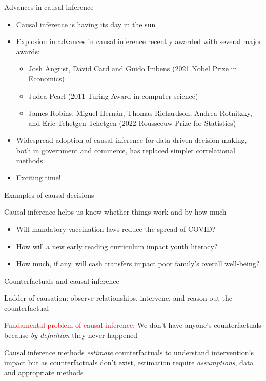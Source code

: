 \documentclass{beamer}
\begin{document}
\begin{frame}{Advances in causal inference}

\begin{itemize}
\item Causal inference is having its day in the sun
\item Explosion in advances in causal inference recently awarded with several major awards: 
	\begin{itemize}
	\item Josh Angrist, David Card and Guido Imbens (2021 Nobel Prize in Economics)
	\item Judea Pearl (2011 Turing Award in computer science)
	\item James Robins, Miguel Hernán, Thomas Richardson, Andrea Rotnitzky, and Eric Tchetgen Tchetgen (2022 Rousseeuw Prize for Statistics)
	\end{itemize}
\item Widespread adoption of causal inference for data driven decision making, both in government and commerce, has replaced simpler correlational methods
\item Exciting time!
\end{itemize}

\end{frame}



\begin{frame}{Examples of causal decisions}

Causal inference helps us know whether things work and by how much

 
\bigskip


\begin{itemize}
\item  Will mandatory vaccination laws reduce the spread of COVID?
\item  How will a new early reading curriculum impact youth literacy?  
\item  How much, if any, will cash transfers impact poor family's overall well-being?
\end{itemize}


\end{frame}


\begin{frame}{Counterfactuals and causal inference}

 Ladder of causation: observe relationships, intervene, and reason out the counterfactual

\bigskip

\textcolor{red}{Fundamental problem of causal inference}: We don't have anyone's counterfactuals because \emph{by definition} they never happened

\bigskip

Causal inference methods \emph{estimate} counterfactuals to understand intervention's impact but as counterfactuals don't exist, estimation require \emph{assumptions}, data and appropriate methods


\end{frame}
\end{document}
